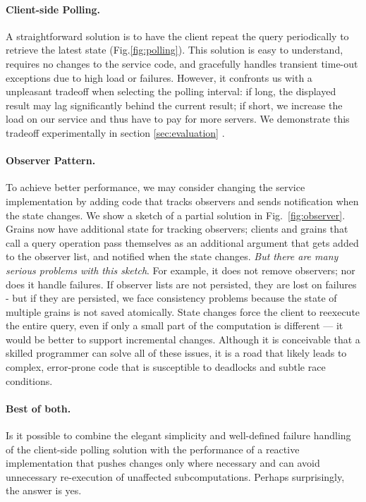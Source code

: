 \paragraph{Client-side Polling. } A straightforward solution is to have the client repeat the query periodically to retrieve the latest state (Fig.\ref{fig:polling}). This solution is easy to understand, requires no changes to the service code, and gracefully handles transient time-out exceptions due to high load or failures. However, it confronts us with a unpleasant tradeoff when selecting the polling interval: if long, the displayed result may lag significantly behind the current result; if short, we increase the load on our service and thus have to pay for more servers. We demonstrate this tradeoff experimentally in section \ref{sec:evaluation} .

\paragraph{Observer Pattern.} To achieve better performance, we may consider changing the service implementation by adding code that tracks observers and sends notification when the state changes. We show a sketch of a partial solution in Fig.~\ref{fig:observer}. Grains now have additional state for tracking observers; clients and grains that call a query operation pass themselves as an additional argument that gets added to the observer list, and notified when the state changes. \emph{But there are many serious problems with this sketch}. For example, it does not remove observers; nor does it handle failures. If observer lists are not persisted, they are lost on failures - but if they are persisted, we face consistency problems because the state of multiple grains is not saved atomically.  State changes force the client to reexecute the entire query, even if only a small part of the computation is different --- it would be better to support incremental changes. Although it is conceivable that a skilled programmer can solve all of these issues, it is a road that likely leads to complex, error-prone code that is susceptible to deadlocks and subtle race conditions.

\paragraph{Best of both.} Is it possible to combine the elegant simplicity and well-defined failure handling of the client-side polling  solution with the performance of a reactive implementation that pushes changes only where necessary and can avoid unnecessary re-execution of unaffected subcomputations. Perhaps surprisingly, the answer is yes.

